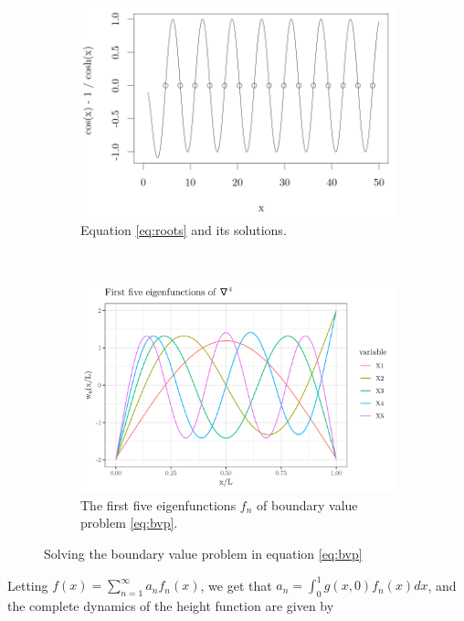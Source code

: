 \begin{figure}[tbhp]
    \centering
    \begin{subfigure}[b]{0.48\textwidth}
        \centering
        \includegraphics[width=\textwidth]{eq_roots.png}
        \caption{Equation \ref{eq:roots} and its solutions.}
        \label{subfig:roots}
    \end{subfigure}
    ~
    \begin{subfigure}[b]{0.48\textwidth}
        \centering
        \includegraphics[width=\textwidth]{efuncs.png}
        \caption{The first five eigenfunctions $f_n$ of boundary value problem \ref{eq:bvp}.}
        \label{subfig:efuncs}
    \end{subfigure}
    \caption{Solving the boundary value problem in equation \ref{eq:bvp}}
    \label{fig:bvp_sol}
\end{figure}

Letting $f(x) = \sum_{n=1}^\infty a_n f_n(x)$, we get that $a_n = \int_0^1 g(x, 0) f_n(x)dx$, and the complete dynamics of the height function are given by 

